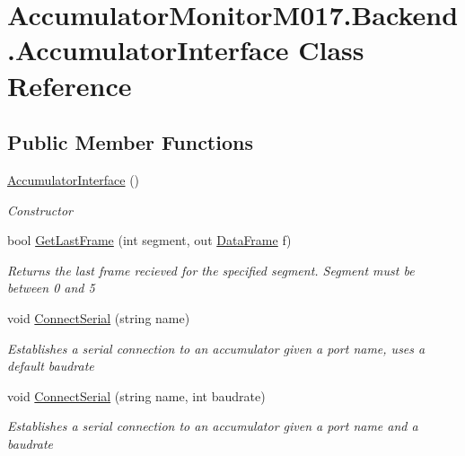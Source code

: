 \hypertarget{class_accumulator_monitor_m017_1_1_backend_1_1_accumulator_interface}{}\section{Accumulator\+Monitor\+M017.\+Backend.\+Accumulator\+Interface Class Reference}
\label{class_accumulator_monitor_m017_1_1_backend_1_1_accumulator_interface}
\subsection*{Public Member Functions}
\begin{DoxyCompactItemize}
\item 
\hyperlink{class_accumulator_monitor_m017_1_1_backend_1_1_accumulator_interface_a4e5c338ec699805a939f633e80904d8a}{Accumulator\+Interface} ()
\begin{DoxyCompactList}\small\item\em Constructor \end{DoxyCompactList}\item 
bool \hyperlink{class_accumulator_monitor_m017_1_1_backend_1_1_accumulator_interface_a66eeba662d4bd0a9638b996cd4a5b962}{Get\+Last\+Frame} (int segment, out \hyperlink{class_accumulator_monitor_m017_1_1_backend_1_1_data_frame}{Data\+Frame} f)
\begin{DoxyCompactList}\small\item\em Returns the last frame recieved for the specified segment. Segment must be between 0 and 5 \end{DoxyCompactList}\item 
void \hyperlink{class_accumulator_monitor_m017_1_1_backend_1_1_accumulator_interface_ab842e3062d2f599336fff04710d69860}{Connect\+Serial} (string name)
\begin{DoxyCompactList}\small\item\em Establishes a serial connection to an accumulator given a port name, uses a default baudrate \end{DoxyCompactList}\item 
void \hyperlink{class_accumulator_monitor_m017_1_1_backend_1_1_accumulator_interface_aaee24301961f0417c3274f04e6f5d199}{Connect\+Serial} (string name, int baudrate)
\begin{DoxyCompactList}\small\item\em Establishes a serial connection to an accumulator given a port name and a baudrate \end{DoxyCompactList}\item 

\end{DoxyCompactItemize}
